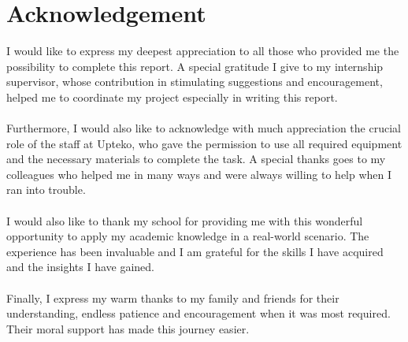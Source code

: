 \chapter*{Acknowledgement}

I would like to express my deepest appreciation to all those who provided me the possibility to complete this report. A special gratitude I give to my internship supervisor, whose contribution in stimulating suggestions and encouragement, helped me to coordinate my project especially in writing this report.
\\ \\
Furthermore, I would also like to acknowledge with much appreciation the crucial role of the staff at Upteko, who gave the permission to use all required equipment and the necessary materials to complete the task. A special thanks goes to my colleagues who helped me in many ways and were always willing to help when I ran into trouble.
\\ \\
I would also like to thank my school for providing me with this wonderful opportunity to apply my academic knowledge in a real-world scenario. The experience has been invaluable and I am grateful for the skills I have acquired and the insights I have gained.
\\ \\
Finally, I express my warm thanks to my family and friends for their understanding, endless patience and encouragement when it was most required. Their moral support has made this journey easier.

